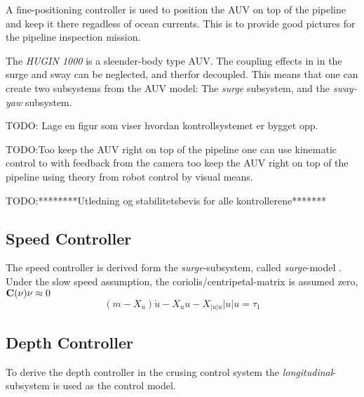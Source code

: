 	A fine-positioning controller is used to position the AUV on top of the pipeline and keep it there regadless 
	of ocean currents. This is to provide good pictures for the pipeline inspection mission.
	
	The \textit{HUGIN 1000} is a sleender-body type AUV. The coupling effects in in the surge and sway can be 
	neglected, and therfor decoupled. This means that one can create two subsystems from the AUV model: 
	The \textit{surge} subsystem, and the \textit{sway-yaw} subsystem. 
	
	TODO: Lage en figur som viser hvordan kontrollsystemet er bygget opp.
	
	TODO:Too keep the AUV right on top of the pipeline one can use kinematic control to with feedback from the 
	camera too keep the AUV right on top of the pipeline using theory from robot control by visual means.
	
	
	TODO:********Utledning og stabilitetsbevis for alle kontrollerene*******
	\subsection{Speed Controller}
		The speed controller is derived form the \textit{surge}-subsystem, called \textit{surge}-model
		\cite{fossen}. Under the slow speed assumption, the coriolis/centripetal-matrix is assumed
		zero, $\mathbf{C}(\mathbf{\nu})\mathbf{\nu} \approx 0$  
		\begin{equation}
			(m - X_{\dot{u}})\dot{u} - X_u u - X_{|u|u}|u| u = \tau_1
		\end{equation}
	
	
	
	\subsection{Depth Controller}
		To derive the depth controller in the crusing control system the
		\textit{longitudinal}-subsystem is used as the control model.

	
